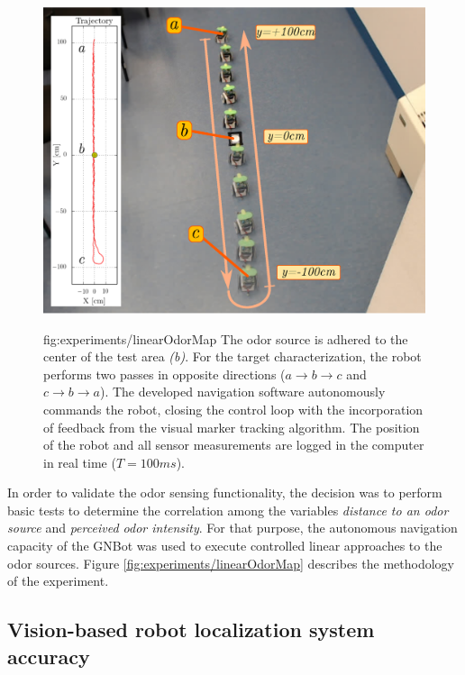 \begin{figure}[h!]
\centerline{\mbox{\includegraphics[width=13.5cm]{images/experiments/linearOdorMap.eps}}}
{fig:experiments/linearOdorMap}{
The odor source is adhered to the center of the test area \emph{(b)}.
For the target characterization, the robot performs two passes in opposite directions ($a \rightarrow b \rightarrow c$ and $c \rightarrow b \rightarrow a$). The developed navigation software autonomously commands the robot, closing the control loop with the incorporation of feedback from the visual marker tracking algorithm.
The position of the robot and all sensor measurements are logged in the computer in real time ($T=100ms$).
}
\end{figure}



In order to validate the odor sensing functionality, the decision was to perform basic tests to determine the correlation among the variables \emph{distance to an odor source} and \emph{perceived odor intensity}.
For that purpose, the autonomous navigation capacity of the GNBot was used to execute controlled linear approaches to the odor sources. Figure \ref{fig:experiments/linearOdorMap} describes the methodology of the experiment.


\vspace{-0.3cm}

\subsection{Vision-based robot localization system accuracy}

